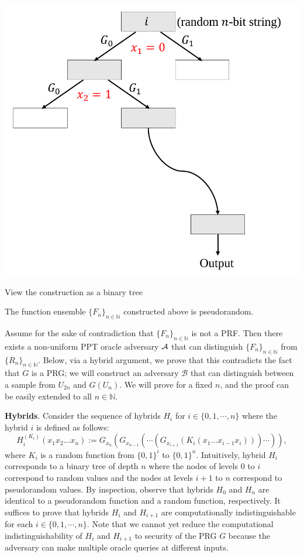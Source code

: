 \begin{marginfigure}
    \centering
    \includegraphics[width=\textwidth]{Old Scribe Notes/binary-tree.pdf}
    \caption{View the construction as a binary tree}
    \label{fig:binary-tree}
\end{marginfigure}

\begin{theorem}\label{theorem:ggm}
    The function ensemble $\{F_n\}_{n \in \mathbb{N}}$ constructed above is pseudorandom.
\end{theorem}

\proof
Assume for the sake of contradiction that $\{F_n\}_{n \in \mathbb{N}}$ is not a PRF.
Then there exists a non-uniform PPT oracle adversary $\mathcal{A}$ that can distinguish $\{F_n\}_{n \in \mathbb{N}}$ from $\{R_n\}_{n \in \mathbb{N}}$. Below, via a hybrid argument, we prove that this contradicts the fact that $G$ is a PRG; we will construct an adversary $\mathcal{B}$ that can distinguish between a sample from $U_{2n}$ and $G(U_{n})$. We will prove for a fixed $n$, and the proof can be easily extended to all $n \in \mathbb{N}$.\smallskip

\noindent \textbf{Hybrids}. Consider the sequence of hybrids $H_i$ for $i \in \{ 0, 1, \cdots, n\}$ where the hybrid $i$ is defined as follows:
\[H_{i}^{(K_i)} (x_1x_2\ldots x_n ):= G_{x_n}(G_{x_{n-1}} (\cdots(G_{x_{i+1}}(K_i(x_1\dots x_{i-1}x_i))) \cdots  )), \]
where $K_i$ is a random function from $\{0,1\}^{i}$ to $\{0,1\}^n$. Intuitively, hybrid $H_i$ corresponds to a binary tree of depth $n$ where the nodes of levels $0$ to $i$ correspond to random values and the nodes at levels $i+1$ to $n$ correspond to pseudorandom values. By inspection, observe that hybrids $H_0$ and $H_n$ are identical to a pseudorandom function and a random function, respectively. It suffices to prove that hybrids $H_i$ and $H_{i+1}$ are computationally indistinguishable for each $i \in \{ 0, 1, \cdots, n\}$. Note that we cannot yet reduce the computational indistinguishability of $H_i$ and $H_{i+1}$ to security of the PRG $G$ because the adversary can make multiple oracle queries at different inputs.\smallskip


